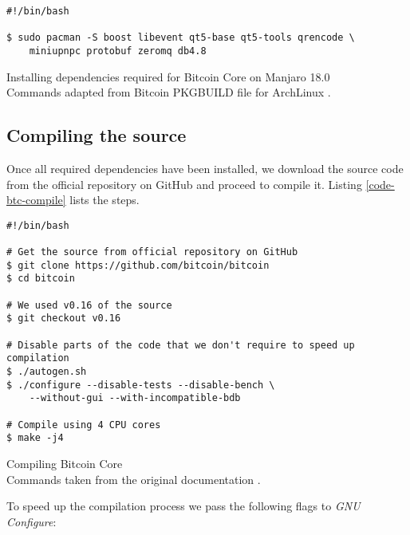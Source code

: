 \begin{listing}[!htb]
    \begin{verbatim}
#!/bin/bash

$ sudo pacman -S boost libevent qt5-base qt5-tools qrencode \
    miniupnpc protobuf zeromq db4.8

\end{verbatim}

\caption[Installing dependencies required for Bitcoin Core on Manjaro 18.0]
{
    Installing dependencies required for Bitcoin Core on Manjaro 18.0 \\
    \footnotesize
    Commands adapted from Bitcoin PKGBUILD file for ArchLinux \cite{bitcoinBuildArch}.
    }
    \label{code-btc-deps-arch}
\end{listing}

\subsection*{Compiling the source}

Once all required dependencies have been installed, we download the source code from the official repository on GitHub and proceed to compile it. Listing \ref{code-btc-compile} lists the steps. 

\begin{listing}[!htb]
    \begin{verbatim}
#!/bin/bash

# Get the source from official repository on GitHub
$ git clone https://github.com/bitcoin/bitcoin
$ cd bitcoin

# We used v0.16 of the source
$ git checkout v0.16

# Disable parts of the code that we don't require to speed up compilation
$ ./autogen.sh
$ ./configure --disable-tests --disable-bench \
    --without-gui --with-incompatible-bdb

# Compile using 4 CPU cores
$ make -j4

    \end{verbatim}

    \caption[Compiling Bitcoin Core]
    {
    Compiling Bitcoin Core \\
    \footnotesize
    Commands taken from the original documentation \cite{bitcoinBuildUnix}.
    }
    \label{code-btc-compile}
\end{listing}

To speed up the compilation process we pass the following flags to \textit{GNU Configure}:

